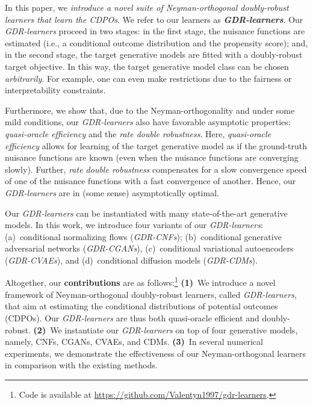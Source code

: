 \documentclass[dvipsnames]{article} %
\newcommand{\GDRlearners}{\emph{GDR-learners}\xspace}
\newcommand{\CDPOs}{CDPOs\xspace}
\begin{document}
In this paper, we \textit{introduce a novel suite of Neyman-orthogonal doubly-robust learners that learn the \CDPOs}. We refer to our learners as \textbf{\GDRlearners}. Our \GDRlearners proceed in two stages: in the first stage, the nuisance functions are estimated (i.e., a conditional outcome distribution and the propensity score); and, in the second stage, the target generative models are fitted with a doubly-robust target objective. In this way, the target generative model class can be chosen \emph{arbitrarily}. For example, one can even make restrictions due to the fairness or interpretability constraints.  

Furthermore, we show that, due to the Neyman-orthogonality and under some mild conditions, 
our \GDRlearners also have favorable asymptotic properties: \emph{quasi-oracle efficiency} and the \emph{rate double robustness}. Here, \emph{quasi-oracle efficiency} \citep{nie2021quasi} allows for learning of the target generative model as if the ground-truth nuisance functions are known (even when the nuisance functions are converging slowly). Further, \emph{rate double robustness} \citep{kang2007demystifying} compensates for a slow convergence speed of one of the nuisance functions with a fast convergence of another.  Hence, our \GDRlearners are in (some sense) asymptotically optimal. 


Our \GDRlearners can be instantiated with many state-of-the-art generative models. In this work, we introduce four variants of our \GDRlearners: 
(a)~conditional normalizing flows (\emph{GDR-CNFs}); (b)~conditional generative adversarial networks (\emph{GDR-CGANs}), (c)~conditional variational autoencoders (\emph{GDR-CVAEs}), and (d)~conditional diffusion models (\emph{GDR-CDMs}).

Altogether, our \textbf{contributions} are as follows:\footnote{Code is available at \url{https://github.com/Valentyn1997/gdr-learners}.} \textbf{(1)}~We introduce a novel framework of Neyman-orthogonal doubly-robust learners, called \GDRlearners, that aim at estimating the conditional distributions of potential outcomes (\CDPOs). Our \GDRlearners are thus both quasi-oracle efficient and doubly-robust. \textbf{(2)}~We instantiate our \GDRlearners on top of four generative models, namely, CNFs, CGANs, CVAEs, and CDMs. \textbf{(3)}~In several numerical experiments, we demonstrate the effectiveness of our Neyman-orthogonal learners in comparison with the existing methods. 
\end{document}
